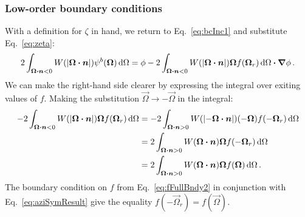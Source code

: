 \subsubsection{Low-order boundary conditions}
With a definition for $\zeta$ in hand, we return to Eq.~\eqref{eq:bcInc1} and
substitute Eq.~\eqref{eq:zeta}:
\begin{equation*}
  2\int_{\bm{\Omega}\bm{\cdot} \bm{n} < 0}
  W(\left| \bm{\Omega} \bm{\cdot} \bm{n} \right|) \psi^b(\bm{\Omega}) \mathop{}\!\mathrm{d}\Omega
  = \phi
  - 2\int_{\bm{\Omega}\bm{\cdot} \bm{n} < 0} W(\left| \bm{\Omega} \bm{\cdot} \bm{n} \right|)
  \bm{\Omega} f(\bm{\Omega}_r) \mathop{}\!\mathrm{d}\Omega
  \bm{\cdot} \bm{\nabla} \phi \,.
\end{equation*}
We can make the right-hand side clearer by expressing the integral over exiting
values of $f$. Making the substitution $\vec{\Omega}\to-\vec{\Omega}$ in the
integral:
\begin{align*}
  - 2\int_{\bm{\Omega}\bm{\cdot} \bm{n} < 0} W(\left| \bm{\Omega} \bm{\cdot} \bm{n} \right|)
  \bm{\Omega} f(\bm{\Omega}_r) \mathop{}\!\mathrm{d}\Omega
  &= 
  - 2\int_{\bm{\Omega}\bm{\cdot} \bm{n} > 0} W(\left| -\bm{\Omega} \bm{\cdot} \bm{n} \right|)
  ( - \bm{\Omega}) f(-\bm{\Omega}_r) \mathop{}\!\mathrm{d}\Omega
  \\
  &= 
  2\int_{\bm{\Omega}\bm{\cdot} \bm{n} > 0} W(\bm{\Omega} \bm{\cdot} \bm{n})
  \bm{\Omega} f(-\bm{\Omega}_r) \mathop{}\!\mathrm{d}\Omega
  \\ 
  &= 
  2\int_{\bm{\Omega}\bm{\cdot} \bm{n} > 0} W(\bm{\Omega} \bm{\cdot} \bm{n})
  \bm{\Omega} f(\bm{\Omega}) \mathop{}\!\mathrm{d}\Omega \,.
\end{align*}
The boundary condition on $f$ from Eq.~\eqref{eq:fFullBndy2} in conjunction
with Eq.~\eqref{eq:aziSymResult} give the equality $f(-\vec{\Omega}_r) =
f(\vec{\Omega})$.


